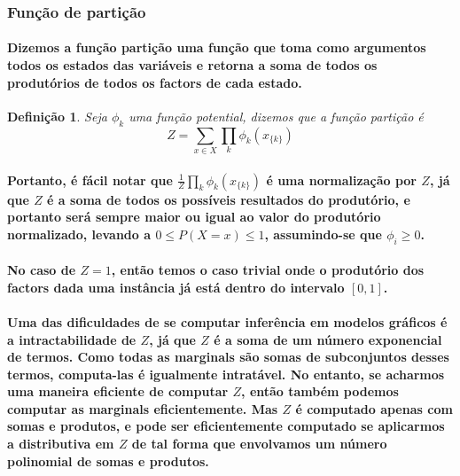 \documentclass[a4paper,10pt]{article}
\theoremstyle{plain}
\newtheorem{spn-def}{Definição}
\begin{document}
\subsubsection{Função de partição}

\paragraph{
  Dizemos a função partição uma função que toma como argumentos todos os estados das variáveis e
  retorna a soma de todos os produtórios de todos os factors de cada estado.
}

\begin{spn-def} Seja $\phi_k$ uma função potential, dizemos que a função partição é
  \begin{equation}
    Z = \sum_{x \in X} \prod_k \phi_k (x_{\{k\}})
  \end{equation}
\end{spn-def}

\paragraph{
  Portanto, é fácil notar que $\frac{1}{Z} \prod_k \phi_k (x_{\{k\}})$ é uma normalização por $Z$,
  já que $Z$ é a soma de todos os possíveis resultados do produtório, e portanto será sempre maior
  ou igual ao valor do produtório normalizado, levando a $0 \leq P(X = x) \leq 1$, assumindo-se que
  $\phi_i \geq 0$.
}

\paragraph{
  No caso de $Z=1$, então temos o caso trivial onde o produtório dos factors dada uma instância já
  está dentro do intervalo $[0,1]$.
}

\paragraph{
  Uma das dificuldades de se computar inferência em modelos gráficos é a intractabilidade de $Z$,
  já que $Z$ é a soma de um número exponencial de termos. Como todas as marginals\cite{report-5}
  são somas de subconjuntos desses termos, computa-las é igualmente intratável. No entanto, se
  acharmos uma maneira eficiente de computar $Z$, então também podemos computar as marginals
  eficientemente. Mas $Z$ é computado apenas com somas e produtos, e pode ser eficientemente
  computado se aplicarmos a distributiva em $Z$ de tal forma que envolvamos um número polinomial de
  somas e produtos.
}
\end{document}
